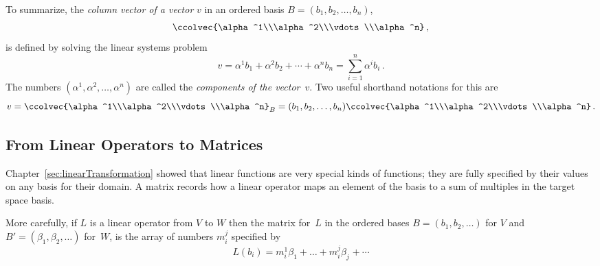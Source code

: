 To summarize, the {\it column vector 
of a vector} $v$ in an ordered basis $B=(b_1,b_2,\ldots,b_n)$,
$$\ccolvec{\alpha^1\\\alpha^2\\\vdots\\\alpha^n}\, ,$$ is defined by solving the linear systems problem
$$
v=\alpha^1 b_1 + \alpha^2b_2 +\cdots + \alpha^n b_n = \sum_{i=1}^n \alpha^i b_i\, .
$$
The numbers $(\alpha^1,\alpha^2,\ldots,\alpha^n)$ are called the {\it components of the vector}~$v$.
Two useful shorthand notations for this are
$$
v=\ccolvec{\alpha^1\\\alpha^2\\\vdots\\\alpha^n}_B = (b_1,b_2,\ldots,b_n)\ccolvec{\alpha^1\\\alpha^2\\\vdots\\\alpha^n}\, .
$$

\subsection{From Linear Operators to Matrices}

Chapter~\ref{sec:linearTransformation} showed that linear functions are very special kinds of functions; 
they are fully specified by their values on any basis for their domain. 
A matrix  records how a linear operator maps an element of the basis to a sum of multiples in the target space basis.

More carefully, if $L$ is a linear operator from $V$ to $W$ 
then the matrix for~$L$ in the ordered bases $B=(b_1,b_2,\dots)$ for $V$ and $B'=(\beta_1,\beta_2,\dots)$ for~$W$, is the
 array of numbers %
%
 $m_{i}^j$ specified by 
$$L(b_i)= m_{i}^1\beta_1^{\phantom{1}}+\dots +m_{i}^j \beta_j^{\phantom{1}}+\cdots$$

